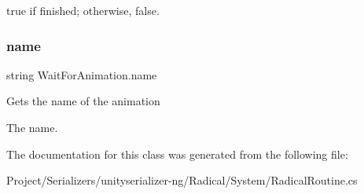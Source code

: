 {\ttfamily true} if finished; otherwise, {\ttfamily false}. \mbox{\label{class_wait_for_animation_a2bd9db632988be8570fb739741d80222}} 
\subsubsection{\texorpdfstring{name}{name}}
{\footnotesize\ttfamily string Wait\+For\+Animation.\+name\hspace{0.3cm}{\ttfamily [get]}}



Gets the name of the animation 

The name. 

The documentation for this class was generated from the following file\+:\begin{DoxyCompactItemize}
\item 
Project/\+Serializers/unityserializer-\/ng/\+Radical/\+System/Radical\+Routine.\+cs\end{DoxyCompactItemize}
